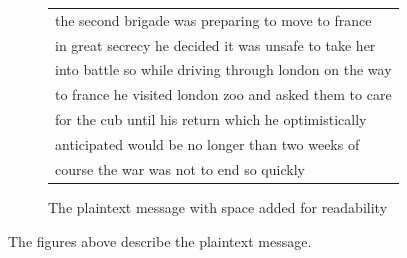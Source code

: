 \documentclass[11pt]{report}
\begin{document}
\begin{figure}
\centering
\begin{tabular}{| l |}
\hline
the second brigade was preparing to move to france\\
in great secrecy he decided it was unsafe to take her\\
into battle so while driving through london on the way\\
to france he visited london zoo and asked them to care\\
for the cub until his return which he optimistically\\
anticipated would be no longer than two weeks of\\
course the war was not to end so quickly\\
\hline
\end{tabular}
\caption{The plaintext message with space added for readability}
\end{figure}
The figures above describe the plaintext message.
\end{document}

